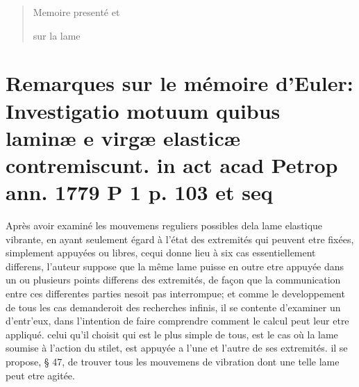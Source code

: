 \documentclass[11pt,a4paper]{article}
\begin{document}

\begin{quote}
Memoire presenté et 

sur la lame
\end{quote}


\section{Remarques sur le mémoire d'Euler: Investigatio motuum quibus laminæ e virgæ elasticæ contremiscunt. in act acad Petrop ann. 1779 P 1 p. 103 et seq}

Après avoir examiné les mouvemens reguliers possibles dela lame elastique vibrante,
en ayant seulement égard à l'état des extremités qui peuvent etre fixées, simplement
appuyées ou libres, cequi donne lieu à six cas essentiellement differens, l'auteur suppose
que la même lame puisse en outre etre appuyée dans un ou plusieurs points differens
des extremités, de façon  que la communication entre ces differentes parties nesoit pas
interrompue; et comme le developpement de tous les cas demanderoit des recherches
infinis, il se contente d'examiner un d'entr'eux, dans l'intention de faire comprendre
comment le calcul peut leur etre appliqué. celui qu'il choisit qui est le plus
simple de tous, est le cas où la lame soumise à l'action du stilet, est appuyée
a l'une et l'autre de ses extremités. il se propose, § 47, de trouver tous les
mouvemens de vibration dont une telle lame peut etre agitée.
\end{document}
